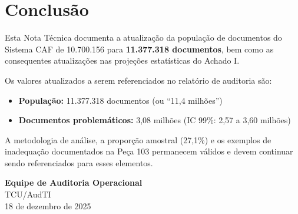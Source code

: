\documentclass[11pt,a4paper]{article}
\begin{document}
\section{Conclusão}

Esta Nota Técnica documenta a atualização da população de documentos do Sistema CAF de 10.700.156 para \textbf{11.377.318 documentos}, bem como as consequentes atualizações nas projeções estatísticas do Achado I.

Os valores atualizados a serem referenciados no relatório de auditoria são:

\begin{itemize}
    \item \textbf{População:} 11.377.318 documentos (ou ``11,4 milhões'')
    \item \textbf{Documentos problemáticos:} 3,08 milhões (IC 99\%: 2,57 a 3,60 milhões)
\end{itemize}

A metodologia de análise, a proporção amostral (27,1\%) e os exemplos de inadequação documentados na Peça 103 permanecem válidos e devem continuar sendo referenciados para esses elementos.

\vspace{1cm}

\begin{flushright}
\textbf{Equipe de Auditoria Operacional}\\
TCU/AudTI\\
18 de dezembro de 2025
\end{flushright}
\end{document}
